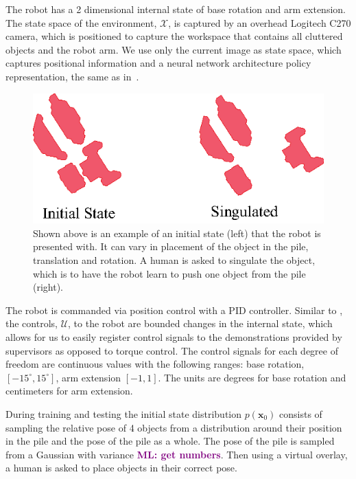 \documentclass[10pt, conference]{ieeeconf}      %
\newcommand{\bx}{\mathbf{x}}
\newcommand{\mlnote}[1]{\ifthenelse{ \boolean{include-notes}}%
 {\textcolor{purple}{\textbf{ML: #1}}}{}}
\begin{document}
The robot has a 2 dimensional internal state of base rotation and arm extension. The state space of the environment, $\mathcal{X}$, is captured by  an overhead Logitech C270 camera, which is positioned to capture the workspace that contains all cluttered objects and the robot arm. We use only the current image as state space, which captures positional information and a neural network architecture policy representation, the same as in~\cite{laskeyrobot}.

\begin{figure}
\centering
\includegraphics{f_figs/singulation.eps}
\caption{
    \footnotesize
Shown above is an example of an initial state (left) that the robot is presented with. It can vary in placement of the object in the pile, translation and rotation. A human is asked to singulate the object, which is to have the robot learn to push one object from the pile (right).  }

\label{fig:izzy_rw}
\end{figure}

The robot is commanded via position 
control with a  PID controller. Similar to \cite{laskeyshiv}, the controls, $\mathcal{U}$, to the robot are bounded changes in the internal state, which allows for us to easily register control signals to the demonstrations provided by supervisors as opposed to torque control. The control signals for each degree of freedom are continuous values with the following ranges: base rotation, $[-15^\circ,15^\circ]$, arm extension $[-1,1]$. The units are degrees for base rotation and centimeters for arm extension. 

During training and testing the initial state distribution $p(\bx_0)$ consists of sampling the relative pose of 4 objects from a distribution around their position in the pile and the pose of the pile as a whole. The pose of the pile is sampled from a Gaussian with variance \mlnote{get numbers}. Then using a virtual overlay,  a human is asked to place objects in their correct pose. 
\end{document}
